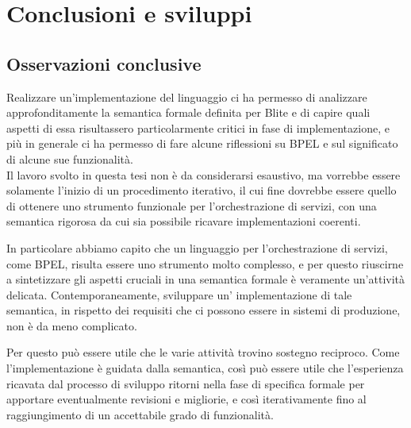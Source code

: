 \chapter{Conclusioni e sviluppi}

\section{Osservazioni conclusive}

Realizzare un'implementazione del linguaggio ci ha permesso di analizzare
approfonditamente la semantica formale definita per Blite e di capire quali
aspetti di essa risultassero particolarmente critici in fase di implementazione,
e più in generale ci ha permesso di fare alcune riflessioni su BPEL e
sul significato di alcune sue funzionalità.
\\

Il lavoro svolto in questa tesi non è da considerarsi esaustivo, 
ma vorrebbe essere solamente l'inizio di un procedimento iterativo, il cui fine
dovrebbe essere quello di ottenere uno strumento funzionale per
l'orchestrazione di servizi, con una semantica rigorosa da cui sia possibile
ricavare implementazioni coerenti. 

In particolare abbiamo capito che un linguaggio per l'orchestrazione di servizi,
come BPEL, risulta essere uno strumento molto complesso, e per questo
riuscirne a sintetizzare gli aspetti cruciali in una semantica formale è
veramente un'attività delicata. Contemporaneamente, sviluppare un'
implementazione di tale semantica, in rispetto dei requisiti che ci possono
essere in sistemi di produzione, non è da meno complicato. 

Per questo può essere utile che le varie attività trovino sostegno reciproco.
Come l'implementazione è guidata dalla semantica, così può essere utile che
l'esperienza ricavata dal processo di sviluppo ritorni nella fase di specifica
formale per apportare eventualmente revisioni e migliorie, e così
iterativamente fino al raggiungimento di un accettabile grado di funzionalità.
\\

% 


